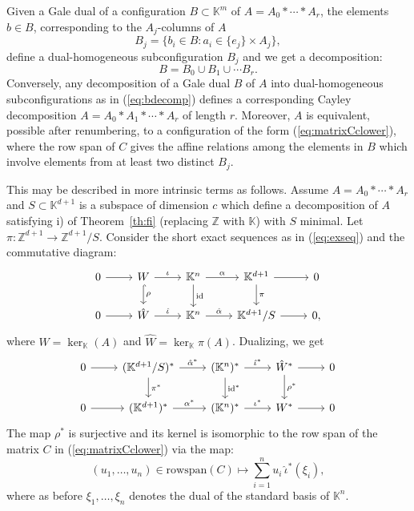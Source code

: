 \documentclass[11pt]{amsart}
\theoremstyle{plain}
\theoremstyle{definition}
\theoremstyle{remark}
\newcommand{\baseRing}[1]{\ensuremath{\mathbb{#1}}}
\newcommand{\Z}{\baseRing{Z}}
\newcommand{\beq}{\begin{equation}}
\newcommand{\eeq}{\end{equation}}
\renewcommand{\k}{{\mathbb K}}
\numberwithin{equation}{section}
\begin{document}
 
Given
 a Gale dual of a configuration  $B \subset \k^m$ of $A=A_0 \ast \cdots \ast A_r$, the elements $b \in B$, corresponding to the $A_j$-columns of $A$  
\begin{equation}\label{eq:Bj}
B_j = \{b_i \in B : a_i \in \{e_j\}\times A_j\},
\end{equation}
define a dual-homogeneous subconfiguration $B_j$ and we get a decomposition:
\beq\label{eq:bdecomp}
B = B_0 \cup B_1 \cup \cdots B_r.
\eeq
Conversely, any decomposition of a Gale dual $B$ of $A$  
into dual-homogeneous subconfigurations as in (\ref{eq:bdecomp})
defines a corresponding Cayley decomposition
$A = A_0\ast A_1 \ast \cdots \ast A_r$
of length $r$.  
Moreover, $A$ is equivalent, possible after renumbering, to a configuration of the form (\ref{eq:matrixCclower}), 
where the row span of $C$ gives the affine relations among the elements in $B$ 
which involve elements from at least two distinct $B_j$.

\smallskip


This may be described in more intrinsic terms as follows. Assume $A=A_0 \ast \cdots \ast A_r$ and $S \subset\k^{d+1}$ is a subspace of dimension $c$
which define a decomposition of $A$ satisfying  i) of Theorem~\ref{th:fi} (replacing $\Z$ with $\k$) with $S$ minimal. Let
$\pi: \Z^{d+1} \to \Z^{d+1}/S$. 
 Consider the short exact sequences as in (\ref{eq:exseq}) and the commutative diagram:
\beq\label{fi:gale}
\begin{tikzcd}
0 \arrow[r] & W \arrow[d,hook, "\rho"] \arrow[r,"\iota"] & \k^n \arrow[d,"{\mathrm{id}}"] \arrow[r,"\alpha"] & \k^{d+1} \arrow[d,"\pi"] \arrow[r] & 0\\
0 \arrow[r] & \hat W  \arrow[r,"\hat \iota"] & \k^n  \arrow[r,"\hat\alpha"] & \k^{d+1}/S  \arrow[r] & 0,
\end{tikzcd}
\eeq
where $W = \ker_\k(A)$ and $\hat W = \ker_\k \pi(A)$.  Dualizing, we get 
\beq\label{fi:galedual}
\begin{tikzcd}
0 \arrow[r] & (\k^{d+1}/S)^* \arrow[d, "\pi^*"] \arrow[r,"\hat\alpha^*"] & (\k^n)^* \arrow[d,"{\mathrm{id}^*}"] \arrow[r,"\hat\iota^*"] & \hat W^* \arrow[d,"\rho^*"] \arrow[r] & 0\\
0 \arrow[r] & (\k^{d+1})^*  \arrow[r, "\alpha^*"] & (\k^n)^*  \arrow[r,"\iota^*"] & W^*  \arrow[r] & 0
\end{tikzcd}
\eeq
The map $\rho^*$ is surjective and its kernel is isomorphic to the row span of the matrix $C$ in (\ref{eq:matrixCclower}) via the map:
$$(u_1,\dots,u_n)\in {\mathrm{rowspan}}(C) \mapsto \sum_{i=1}^n u_i\,\hat\iota^*(\xi_i),$$
where as before $\xi_1,\dots,\xi_n$ denotes the dual of the standard basis of $\k^n$.  
\end{document}
